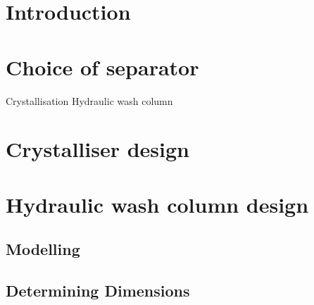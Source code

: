 \section{Introduction}


\section{Choice of separator}
Crystallisation 
Hydraulic wash column 


\section{Crystalliser design}




\section{Hydraulic wash column design}
\subsection{Modelling}

\subsection{Determining Dimensions}

